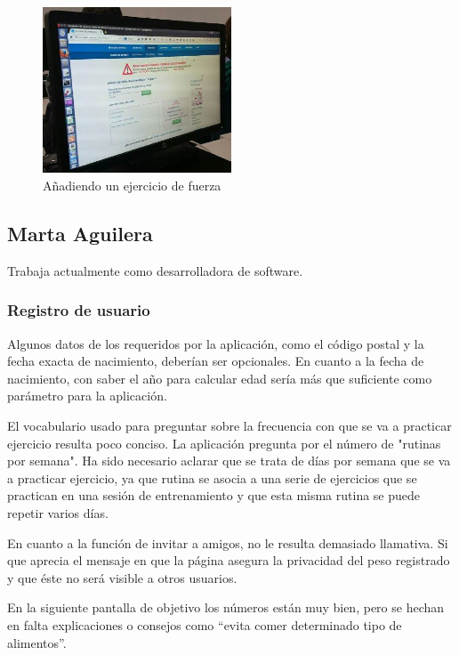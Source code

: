 \documentclass[a4paper]{article}
\begin{document}
			\begin{figure}[!h]
				\centering
				\includegraphics[width=0.5\textwidth]{./figuras/jonat-3.jpg}
				\caption{Añadiendo un ejercicio de fuerza}
			\end{figure}
		
		\FloatBarrier
		
		\subsection{Marta Aguilera}
		
		Trabaja actualmente como desarrolladora de software.
		
			\subsubsection*{Registro de usuario}
			
			Algunos datos de los requeridos por la aplicación, como el código postal y la fecha exacta de nacimiento, deberían ser opcionales. En cuanto a la fecha de nacimiento, con saber el año para calcular edad sería más que suficiente como parámetro para la aplicación.
			
			El vocabulario usado para preguntar sobre la frecuencia con que se va a practicar ejercicio resulta poco conciso. La aplicación pregunta por el número de "rutinas por semana". Ha sido necesario aclarar que se trata de días por semana que se va a practicar ejercicio, ya que rutina se asocia a una serie de ejercicios que se practican en una sesión de entrenamiento y que esta misma rutina se puede repetir varios días.
			
			En cuanto a la función de invitar a amigos, no le resulta demasiado llamativa. Si que aprecia el mensaje en que la página asegura la privacidad del peso registrado y que éste no será visible a otros usuarios.
			
			En la siguiente pantalla de objetivo los números están muy bien, pero se hechan en falta explicaciones o consejos como ``evita comer determinado tipo de alimentos''.
			
\end{document}
